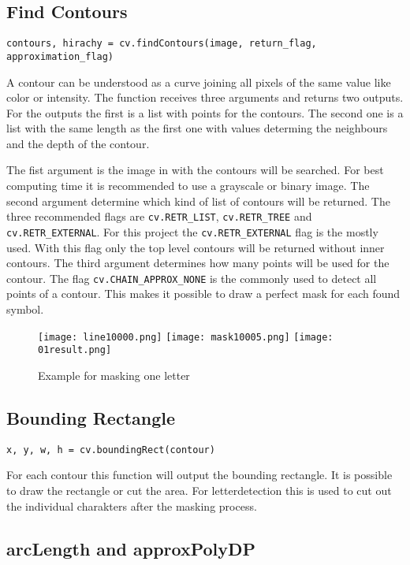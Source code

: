 \subsection{Find Contours}

\texttt{contours, hirachy = cv.findContours(image, return\_flag, approximation\_flag)}

A contour can be understood as a curve joining all pixels of the same value like color or intensity.
The function receives three arguments and returns two outputs.
For the outputs the first is a list with points for the contours.
The second one is a list with the same length as the first one with values determing the neighbours and the depth of the contour.

The fist argument is the image in with the contours will be searched.
For best computing time it is recommended to use a grayscale or binary image.
The second argument determine which kind of list of contours will be returned.
The three recommended flags are \texttt{cv.RETR\_LIST}, \texttt{cv.RETR\_TREE} and \texttt{cv.RETR\_EXTERNAL}.
For this project the \texttt{cv.RETR\_EXTERNAL} flag is the mostly used.
With this flag only the top level contours will be returned without inner contours.
The third argument determines how many points will be used for the contour.
The flag \texttt{cv.CHAIN\_APPROX\_NONE} is the commonly used to detect all points of a contour.
This makes it possible to draw a perfect mask for each found symbol.

\begin{figure}[H]
    \centering
    \texttt{[image: line10000.png]}
    \texttt{[image: mask10005.png]}
    \texttt{[image: 01result.png]}
    \caption{Example for masking one letter}
\end{figure}

\subsection{Bounding Rectangle}

\texttt{x, y, w, h = cv.boundingRect(contour)}

For each contour this function will output the bounding rectangle.
It is possible to draw the rectangle or cut the area.
For letterdetection this is used to cut out the individual charakters after the masking process.

\subsection{arcLength and approxPolyDP}

